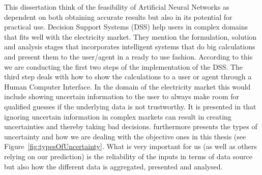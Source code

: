 This dissertation think of the feasibility of Artificial Neural Networks as dependent on both obtaining accurate results but also in its potential for practical use. Decision Support Systems (DSS) help users in complex domains that fits well with the electricity market. They mention the formulation, solution and analysis stages that incorporates intelligent systems that do big calculations and present them to the user/agent in a ready to use fashion. According to this we are conducting the first two steps of the implementation of the DSS. The third step deals with how to show the calculations to a user or agent through a Human Computer Interface. In the domain of the electricity market this would include showing uncertain information to the user to always make room for qualified guesses if the underlying data is not trustworthy. It is presented in \cite{UncertainInformation} that ignoring uncertain information in complex markets can result in creating uncertainties and thereby taking bad decisions. \cite{UncertainInformation} furthermore presents the types of uncertainty and how we are dealing with the objective ones in this thesis (see Figure~\ref{fig:typesOfUncertainty}. What is very important for us (as well as others relying on our prediction) is the reliability of the inputs in terms of data source but also how the different data is aggregated, presented and analysed.